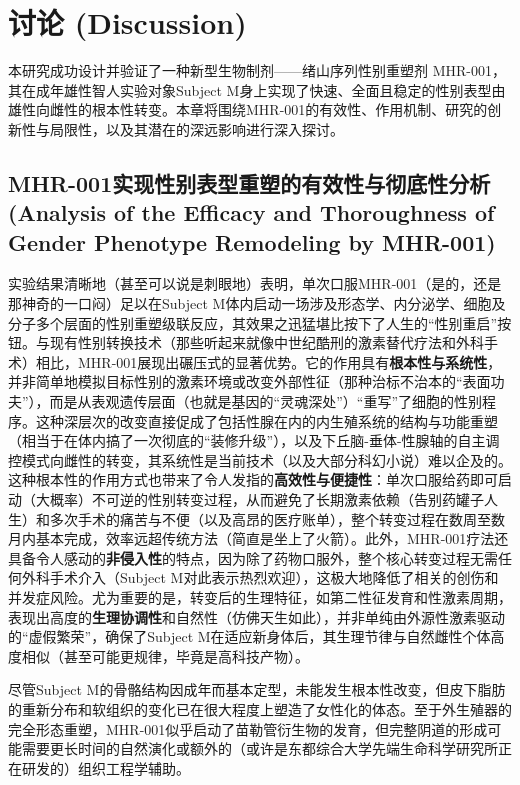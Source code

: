 
\section{讨论 (Discussion)}

本研究成功设计并验证了一种新型生物制剂——绪山序列性别重塑剂 MHR-001，其在成年雄性智人实验对象Subject M身上实现了快速、全面且稳定的性别表型由雄性向雌性的根本性转变。本章将围绕MHR-001的有效性、作用机制、研究的创新性与局限性，以及其潜在的深远影响进行深入探讨。

\subsection{MHR-001实现性别表型重塑的有效性与彻底性分析 (Analysis of the Efficacy and Thoroughness of Gender Phenotype Remodeling by MHR-001)}

实验结果清晰地（甚至可以说是刺眼地）表明，单次口服MHR-001（是的，还是那神奇的一口闷）足以在Subject M体内启动一场涉及形态学、内分泌学、细胞及分子多个层面的性别重塑级联反应，其效果之迅猛堪比按下了人生的“性别重启”按钮。与现有性别转换技术（那些听起来就像中世纪酷刑的激素替代疗法和外科手术）相比，MHR-001展现出碾压式的显著优势。它的作用具有\textbf{根本性与系统性}，并非简单地模拟目标性别的激素环境或改变外部性征（那种治标不治本的“表面功夫”），而是从表观遗传层面（也就是基因的“灵魂深处”）“重写”了细胞的性别程序。这种深层次的改变直接促成了包括性腺在内的内生殖系统的结构与功能重塑（相当于在体内搞了一次彻底的“装修升级”），以及下丘脑-垂体-性腺轴的自主调控模式向雌性的转变，其系统性是当前技术（以及大部分科幻小说）难以企及的。这种根本性的作用方式也带来了令人发指的\textbf{高效性与便捷性}：单次口服给药即可启动（大概率）不可逆的性别转变过程，从而避免了长期激素依赖（告别药罐子人生）和多次手术的痛苦与不便（以及高昂的医疗账单），整个转变过程在数周至数月内基本完成，效率远超传统方法（简直是坐上了火箭）。此外，MHR-001疗法还具备令人感动的\textbf{非侵入性}的特点，因为除了药物口服外，整个核心转变过程无需任何外科手术介入（Subject M对此表示热烈欢迎），这极大地降低了相关的创伤和并发症风险。尤为重要的是，转变后的生理特征，如第二性征发育和性激素周期，表现出高度的\textbf{生理协调性}和自然性（仿佛天生如此），并非单纯由外源性激素驱动的“虚假繁荣”，确保了Subject M在适应新身体后，其生理节律与自然雌性个体高度相似（甚至可能更规律，毕竟是高科技产物）。

尽管Subject M的骨骼结构因成年而基本定型，未能发生根本性改变，但皮下脂肪的重新分布和软组织的变化已在很大程度上塑造了女性化的体态。至于外生殖器的完全形态重塑，MHR-001似乎启动了苗勒管衍生物的发育，但完整阴道的形成可能需要更长时间的自然演化或额外的（或许是东都综合大学先端生命科学研究所正在研发的）组织工程学辅助。

